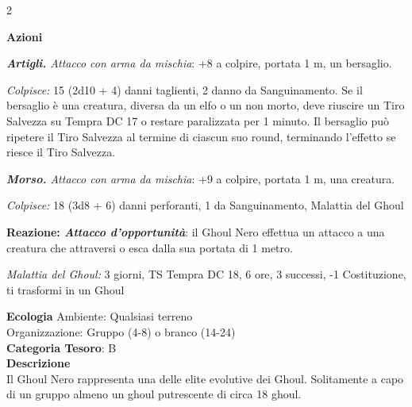 \begin{multicols}{2}
{\textbf{Azioni}

\emph{\textbf{Artigli.} Attacco con arma da mischia}: +8 a colpire, portata 1 m, un bersaglio.

\emph{Colpisce:} 15 (2d10 + 4) danni taglienti, 2 danno da Sanguinamento. Se il bersaglio è una creatura, diversa da un elfo o un non morto, deve riuscire un Tiro Salvezza su Tempra DC 17 o restare paralizzata per 1 minuto. Il bersaglio può ripetere il Tiro Salvezza al termine di ciascun suo round, terminando l'effetto se riesce il Tiro Salvezza.

\emph{\textbf{Morso.} Attacco con arma da mischia}: +9 a colpire, portata 1 m, una creatura.

\emph{Colpisce:} 18 (3d8 + 6) danni perforanti, 1 da Sanguinamento, Malattia del Ghoul

\textbf{Reazione: \emph{Attacco d'opportunità}}: il Ghoul Nero effettua un attacco a una creatura che attraversi o esca dalla sua portata di 1 metro.

\emph{Malattia del Ghoul:} 3 giorni, TS Tempra DC 18, 6 ore, 3 successi, -1 Costituzione, ti trasformi in un Ghoul

\textbf{Ecologia}
Ambiente: Qualsiasi terreno\\
Organizzazione: Gruppo (4-8) o branco (14-24)\\
\textbf{Categoria Tesoro}: B\\
\textbf{Descrizione}\\
Il Ghoul Nero rappresenta una delle elite evolutive dei Ghoul. Solitamente a capo di un gruppo almeno un ghoul putrescente di circa 18 ghoul.


}
\end{multicols}
